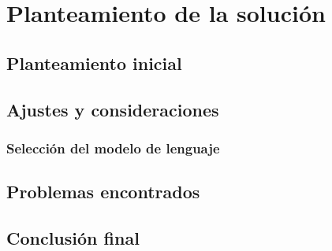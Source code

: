 \chapter{Planteamiento de la solución}
\label{cap:planteamiento}
\section{Planteamiento inicial}

\section{Ajustes y consideraciones}

\subsection{Selección del modelo de lenguaje}


\section{Problemas encontrados}

\section{Conclusión final}

